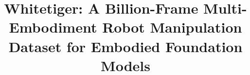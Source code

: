 \documentclass[10pt,twocolumn,letterpaper]{article}
\title{Whitetiger: A Billion-Frame Multi-Embodiment Robot Manipulation Dataset for Embodied Foundation Models}
\author{}
\date{}
\begin{document}
\maketitle







{\small


}

\clearpage
\onecolumn
\appendix

\end{document}
